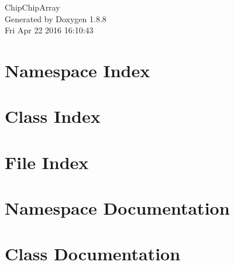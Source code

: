 \documentclass[twoside]{book}
\newcommand{\+}{\discretionary{\mbox{\scriptsize$\hookleftarrow$}}{}{}}
\newcommand{\clearemptydoublepage}{%
  \newpage{\pagestyle{empty}\cleardoublepage}%
}
\begin{document}
\hypersetup{pageanchor=false,
             bookmarks=true,
             bookmarksnumbered=true,
             pdfencoding=unicode
            }
\begin{titlepage}
\vspace*{7cm}
\begin{center}%
{\Large Chip\+Chip\+Array }\\
\vspace*{1cm}
{\large Generated by Doxygen 1.8.8}\\
\vspace*{0.5cm}
{\small Fri Apr 22 2016 16:10:43}\\
\end{center}
\end{titlepage}
\clearemptydoublepage
\tableofcontents
\clearemptydoublepage
{}
\hypersetup{pageanchor=true}

\chapter{Namespace Index}

\chapter{Class Index}

\chapter{File Index}

\chapter{Namespace Documentation}


\chapter{Class Documentation}






\end{document}
